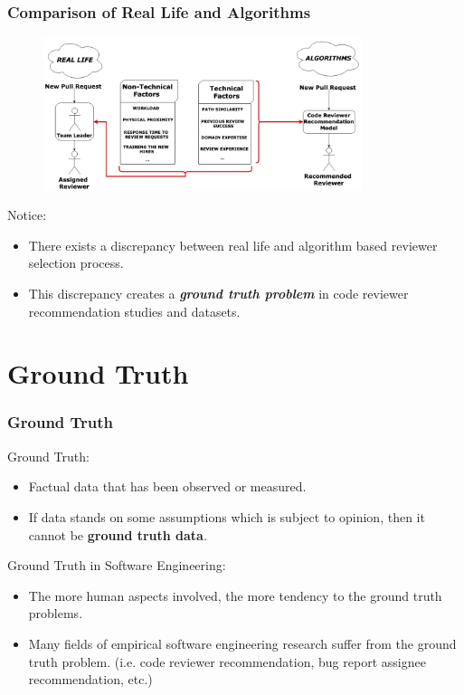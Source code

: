 \documentclass{beamer}
\begin{document}
\begin{frame}
\frametitle{\large Comparison of Real Life and Algorithms}
  \begin{figure}
    \includegraphics[width=0.83\textwidth]{img/comparison.png}
    \end{figure}
    \vspace{-0.24cm}
    \begin{alertblock}{Notice:}
        \begin{itemize}
        \item There exists a discrepancy between real life and algorithm based reviewer selection process.
        \item This discrepancy creates a \textbf{\textit{ground truth problem}} in code reviewer recommendation studies and datasets.
        \end{itemize}
    \end{alertblock}
\end{frame}

\section{Ground Truth}
\begin{frame}
\frametitle{\large Ground Truth}

    \begin{block}{Ground Truth:}
    \begin{itemize}
        \item Factual data that has been observed or measured.
        \item If data stands on some assumptions which is subject to opinion, then it cannot be \textbf{ground truth data}.
    \end{itemize}    
    \end{block}
    \pause
    \begin{block}{Ground Truth in Software Engineering:}
    \begin{itemize}
    \item The more human aspects involved, the more tendency to the ground truth problems.
    \item Many fields of empirical software engineering research suffer from the ground truth problem. (i.e. code reviewer recommendation, bug report assignee recommendation, etc.)   
    \end{itemize}    
    \end{block}    
\end{frame}
\end{document}
